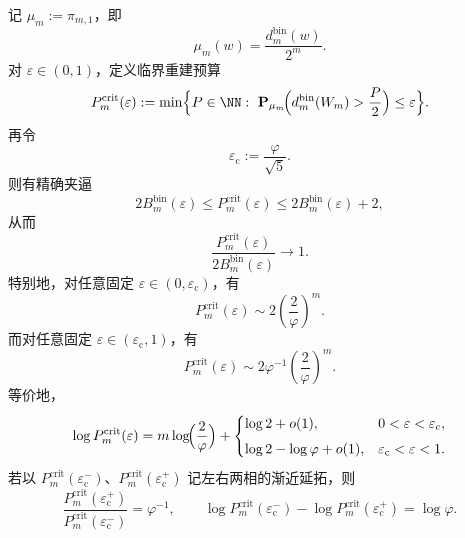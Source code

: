 \begin{theorem}\label{thm:xi-time-part9ob-binfold-sharp-threshold-budget}
记 \(\mu_m:=\pi_{m,1}\)，即
\[
\mu_m(w)=\frac{d_m^{\mathrm{bin}}(w)}{2^m}.
\]
对 \(\varepsilon\in(0,1)\)，定义临界重建预算
\[
P_m^{\mathrm{crit}}(\varepsilon):=
\min\Bigl\{
P\in\NN:\ 
\mathbf P_{\mu_m}\!\Bigl(d_m^{\mathrm{bin}}(W_m)>\frac{P}{2}\Bigr)\le \varepsilon
\Bigr\}.
\]
再令
\[
\varepsilon_{\mathrm c}:=\frac{\varphi}{\sqrt5}.
\]
则有精确夹逼
\[
2B_m^{\mathrm{bin}}(\varepsilon)
\le
P_m^{\mathrm{crit}}(\varepsilon)
\le
2B_m^{\mathrm{bin}}(\varepsilon)+2,
\]
从而
\[
\frac{P_m^{\mathrm{crit}}(\varepsilon)}{2B_m^{\mathrm{bin}}(\varepsilon)}\to 1.
\]
特别地，对任意固定 \(\varepsilon\in(0,\varepsilon_{\mathrm c})\)，有
\[
\boxed{\;
P_m^{\mathrm{crit}}(\varepsilon)
\sim
2\left(\frac{2}{\varphi}\right)^m.\;}
\]
而对任意固定 \(\varepsilon\in(\varepsilon_{\mathrm c},1)\)，有
\[
\boxed{\;
P_m^{\mathrm{crit}}(\varepsilon)
\sim
2\varphi^{-1}\left(\frac{2}{\varphi}\right)^m.\;}
\]
等价地，
\[
\log P_m^{\mathrm{crit}}(\varepsilon)
=
m\log\!\Bigl(\frac{2}{\varphi}\Bigr)
+\begin{cases}
\log 2+o(1),& 0<\varepsilon<\varepsilon_{\mathrm c},\\[4pt]
\log 2-\log\varphi+o(1),& \varepsilon_{\mathrm c}<\varepsilon<1.
\end{cases}
\]
若以 \(P_m^{\mathrm{crit}}(\varepsilon_{\mathrm c}^-)\)、\(P_m^{\mathrm{crit}}(\varepsilon_{\mathrm c}^+)\) 记左右两相的渐近延拓，则
\[
\boxed{\;
\frac{P_m^{\mathrm{crit}}(\varepsilon_{\mathrm c}^+)}
{P_m^{\mathrm{crit}}(\varepsilon_{\mathrm c}^-)}
=\varphi^{-1},\qquad
\log P_m^{\mathrm{crit}}(\varepsilon_{\mathrm c}^-)
-\log P_m^{\mathrm{crit}}(\varepsilon_{\mathrm c}^+)
=\log\varphi.\;}
\]
\end{theorem}
